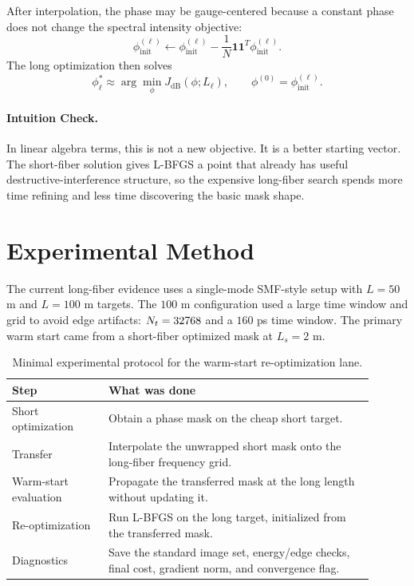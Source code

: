 \documentclass[11pt]{article}
\begin{document}
After interpolation, the phase may be gauge-centered because a constant phase
does not change the spectral intensity objective:
\begin{equation}
\phi_{\mathrm{init}}^{(\ell)}
\leftarrow
\phi_{\mathrm{init}}^{(\ell)}
-\frac{1}{N}\mathbf 1\mathbf 1^T\phi_{\mathrm{init}}^{(\ell)}.
\label{eq:gauge}
\end{equation}
The long optimization then solves
\begin{equation}
\phi_{\ell}^{*}\approx
\arg\min_{\phi} J_{\mathrm{dB}}(\phi;L_{\ell}),
\qquad
\phi^{(0)}=\phi_{\mathrm{init}}^{(\ell)}.
\label{eq:warm-reopt}
\end{equation}

\paragraph{Intuition Check.}
In linear algebra terms, this is not a new objective.  It is a better starting
vector.  The short-fiber solution gives L-BFGS a point that already has useful
destructive-interference structure, so the expensive long-fiber search spends
more time refining and less time discovering the basic mask shape.

\section{Experimental Method}

The current long-fiber evidence uses a single-mode SMF-style setup with
$L=50$ m and $L=100$ m targets.  The $100$ m configuration used a large time
window and grid to avoid edge artifacts: $N_t=32768$ and a $160$ ps time
window.  The primary warm start came from a short-fiber optimized mask at
$L_s=2$ m.

\begin{table}[H]
\centering
\small
\begin{tabular}{>{\raggedright\arraybackslash}p{0.24\linewidth}>{\raggedright\arraybackslash}p{0.66\linewidth}}
\toprule
Step & What was done \\
\midrule
Short optimization & Obtain a phase mask on the cheap short target. \\
Transfer & Interpolate the unwrapped short mask onto the long-fiber frequency grid. \\
Warm-start evaluation & Propagate the transferred mask at the long length without updating it. \\
Re-optimization & Run L-BFGS on the long target, initialized from the transferred mask. \\
Diagnostics & Save the standard image set, energy/edge checks, final cost, gradient norm, and convergence flag. \\
\bottomrule
\end{tabular}
\caption{Minimal experimental protocol for the warm-start re-optimization lane.}
\label{tab:protocol}
\end{table}
\end{document}
